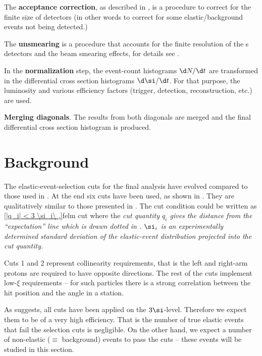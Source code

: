 \> The {\bf acceptance correction}, as described in , is a procedure to correct for the finite size of  detectors (in other words to correct for some elastic/background events not being detected.)

\> The {\bf unsmearing} is a procedure that accounts for the finite resolution of the s detectors and the beam smearing effects, for details see .

\> In the {\bf normalization} step, the event-count histograms $\d N/\d t$ are transformed in the differential cross section histograms $\d\si/\d t$. For that purpose, the luminosity and various efficiency factors (trigger, detection, reconstruction, etc.) are used.

\> {\bf Merging diagonals}. The results from both diagonals are merged and the final differential cross section histogram is produced.





\section[felm bckg]{Background}

\kern-5mm

The elastic-event-selection cuts for the final analysis have evolved compared to those used in . At the end six cuts have been used, as shown in . They are qualitatively similar to those presented in . The cut condition could be written as
\eqref{|q_i| < 3 \si_i\ ,}{felm cut}
where the \em{cut quantity} $q_i$ gives the distance from the ``expectation'' line which is drawn dotted in . $\si_i$ is an experimentally determined standard deviation of the elastic-event distribution projected into the cut quantity.

Cuts 1 and 2 represent collinearity requirements, that is the left and right-arm protons are required to have opposite directions. The rest of the cuts implement low-$\xi$ requirements -- for such particles there is a strong correlation between the hit position and the angle in a station.


As  suggests, all cuts have been applied on the $3\si$-level. Therefore we expect them to be of a very high efficiency. That is the number of true elastic events that fail the selection cuts is negligible. On the other hand, we expect a number of non-elastic ($\equiv$ background) events to pass the cuts -- these events will be studied in this section.


